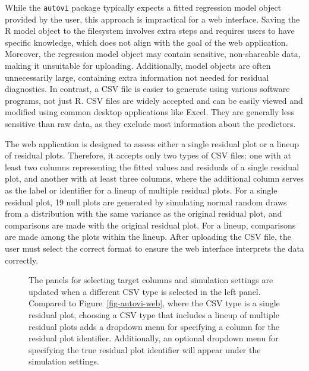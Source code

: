 \documentclass[
doublespace,
  times]{anzsauth}
\begin{document}
While the \texttt{autovi} package typically expects a fitted regression
model object provided by the user, this approach is impractical for a
web interface. Saving the R model object to the filesystem involves
extra steps and requires users to have specific knowledge, which does
not align with the goal of the web application. Moreover, the regression
model object may contain sensitive, non-shareable data, making it
unsuitable for uploading. Additionally, model objects are often
unnecessarily large, containing extra information not needed for
residual diagnostics. In contrast, a CSV file is easier to generate
using various software programs, not just R. CSV files are widely
accepted and can be easily viewed and modified using common desktop
applications like Excel. They are generally less sensitive than raw
data, as they exclude most information about the predictors.

The web application is designed to assess either a single residual plot
or a lineup of residual plots. Therefore, it accepts only two types of
CSV files: one with at least two columns representing the fitted values
and residuals of a single residual plot, and another with at least three
columns, where the additional column serves as the label or identifier
for a lineup of multiple residual plots. For a single residual plot, 19
null plots are generated by simulating normal random draws from a
distribution with the same variance as the original residual plot, and
comparisons are made with the original residual plot. For a lineup,
comparisons are made among the plots within the lineup. After uploading
the CSV file, the user must select the correct format to ensure the web
interface interprets the data correctly.

\begin{figure}


\caption{\label{fig-autovi-web-type}The panels for selecting target
columns and simulation settings are updated when a different CSV type is
selected in the left panel. Compared to Figure~\ref{fig-autovi-web},
where the CSV type is a single residual plot, choosing a CSV type that
includes a lineup of multiple residual plots adds a dropdown menu for
specifying a column for the residual plot identifier. Additionally, an
optional dropdown menu for specifying the true residual plot identifier
will appear under the simulation settings.}

\end{figure}%
\end{document}
